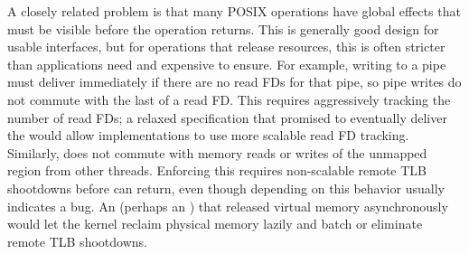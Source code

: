A closely related problem is that many POSIX operations have global
effects that must be visible before the operation returns.
This is generally good design for usable interfaces, but for
operations that release resources, this is often stricter than
applications need and expensive to ensure.  For example, writing
to a pipe
must deliver  immediately if there are no
read FDs for that pipe, so pipe writes do not commute with the last
of a read FD.  This requires aggressively tracking the number of
read FDs; a relaxed specification that promised to eventually deliver the
 would allow implementations to use more scalable
read FD tracking.
Similarly,  does not commute
with memory reads or writes of the unmapped region from other threads.
Enforcing this requires non-scalable remote TLB shootdowns before 
can return, even though depending
on this behavior usually indicates a bug.  An  (perhaps an
) that released virtual memory asynchronously
would let the kernel
reclaim physical memory lazily and batch or eliminate remote TLB
shootdowns.

